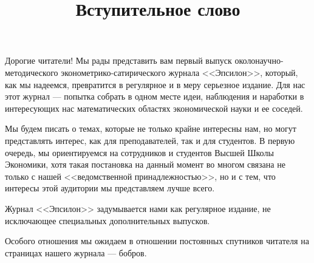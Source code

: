 \documentclass[final,pdftex]{../../template/epsilonj}
\begin{document}
\setcounter{page}{2}

\begin{frontmatter}
\title{Вступительное слово}

\begin{aug}
\author{ }%



\end{aug}



\end{frontmatter}




Дорогие читатели! Мы рады представить вам первый выпуск околонаучно-методического эконометрико-сатирического журнала <<Эпсилон>>, 
который, как мы надеемся, превратится в регулярное и в меру серьезное издание. 
Для нас этот журнал --- попытка
собрать в одном месте идеи, наблюдения и наработки в интересующих нас
математических областях экономической науки и ее соседей.

Мы будем писать о темах, которые не только крайне интересны нам, но могут представлять интерес, как для преподавателей, так и для студентов. 
В первую очередь, мы ориентируемся на сотрудников и студентов Высшей Школы Экономики, хотя такая постановка на данный
момент во многом связана не только с нашей <<ведомственной
принадлежностью>>, но и с тем, что интересы этой аудитории мы представляем лучше всего.

Журнал <<Эпсилон>> задумывается нами как регулярное издание, не
исключающее специальных дополнительных выпусков. 


Особого отношения мы ожидаем в отношении постоянных
спутников читателя на страницах нашего журнала --- бобров.
\end{document}
